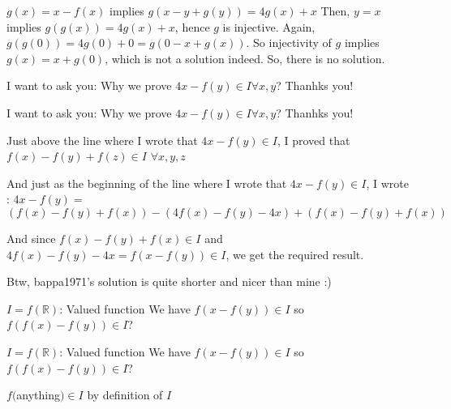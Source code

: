 \begin{solution}
	$g(x)=x-f(x)$ implies $g\left( x-y+g(y) \right) = 4g(x)+x$
Then, $y=x$ implies $g(g(x))=4g(x)+x$, hence $g$ is injective.
Again, $g(g(0))=4g(0)+0=g(0-x+g(x))$. So injectivity of $g$ implies $g(x)=x+g(0)$, which is not a solution indeed.
So, there is no solution.
\end{solution}



\begin{solution}
	I want to ask you: Why we prove $ 4x-f(y) \in I \forall x,y $?
Thanhks you!
\end{solution}



\begin{solution}
	\begin{tcolorbox}I want to ask you: Why we prove $ 4x-f(y) \in I \forall x,y $?
Thanhks you!\end{tcolorbox}
Just above the line where I wrote that $4x-f(y)\in I$, I proved that $f(x)-f(y)+f(z)\in I$ $\forall x,y,z$

And just as the beginning of the line where I wrote that $4x-f(y)\in I$, I wrote :
$4x-f(y)=$ $(f(x)-f(y)+f(x))-(4f(x)-f(y)-4x)+(f(x)-f(y)+f(x))$

And since $f(x)-f(y)+f(x)\in I$ and $4f(x)-f(y)-4x=f(x-f(y))\in I$, we get the required result.

Btw, bappa1971's solution is quite shorter and nicer than mine :)
\end{solution}



\begin{solution}
	$I=f(\mathbb{R})$: Valued function
We have $f(x-f(y))\in I$ so $f(f(x)-f(y))\in I$?
\end{solution}



\begin{solution}
	\begin{tcolorbox}$I=f(\mathbb{R})$: Valued function
We have $f(x-f(y))\in I$ so $f(f(x)-f(y))\in I$?\end{tcolorbox}

$f($anything$)\in I$ by definition of $I$
\end{solution}



